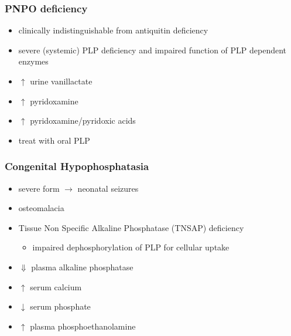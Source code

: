 \documentclass{scrartcl}
\begin{document}
\subsubsection{PNPO deficiency}
\label{sec:org1c2ad09}
\begin{itemize}
\item clinically indistinguishable from antiquitin deficiency
\item severe (systemic) PLP deficiency and impaired function of PLP
dependent enzymes
\item \(\uparrow\) urine vanillactate
\item \(\uparrow\) pyridoxamine
\item \(\uparrow\) pyridoxamine/pyridoxic acids
\item treat with oral PLP
\end{itemize}

\subsubsection{Congenital Hypophosphatasia}
\label{sec:org9bb8e9c}
\begin{itemize}
\item severe form \(\to\) neonatal seizures
\item osteomalacia
\item Tissue Non Specific Alkaline Phosphatase (TNSAP) deficiency
\begin{itemize}
\item impaired dephosphorylation of PLP for cellular uptake
\end{itemize}
\item \(\Downarrow\) plasma alkaline phosphatase
\item \(\uparrow\) serum calcium
\item \(\downarrow\) serum phosphate
\item \(\uparrow\) plasma phosphoethanolamine
\end{itemize}
\end{document}
